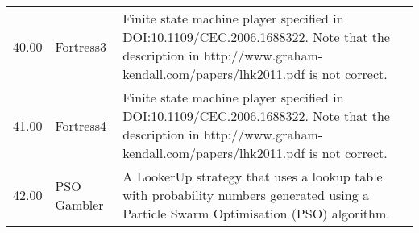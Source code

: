 \begin{table}[!hbtp]
\begin{adjustbox}{width=2\textwidth, angle=90}
\begin{tabular}{rll}
	40.00  & Fortress3                   & Finite state machine player specified in DOI:10.1109/CEC.2006.1688322.
	Note that the description in http://www.graham-kendall.com/papers/lhk2011.pdf
	is not correct.                                                                                                                                                                                                                                                                                                                                                                                                                                                                                                                                                                                                                                                                                                                                                                                                                                             \\
	41.00  & Fortress4                   & Finite state machine player specified in DOI:10.1109/CEC.2006.1688322.
	Note that the description in http://www.graham-kendall.com/papers/lhk2011.pdf
	is not correct.                                                                                                                                                                                                                                                                                                                                                                                                                                                                                                                                                                                                                                                                                                                                                                                                                                             \\
	42.00  & PSO Gambler                 & A LookerUp strategy that uses a lookup table with probability numbers
	generated using a Particle Swarm Optimisation (PSO) algorithm.


\end{tabular}
\end{adjustbox}
\end{table}
